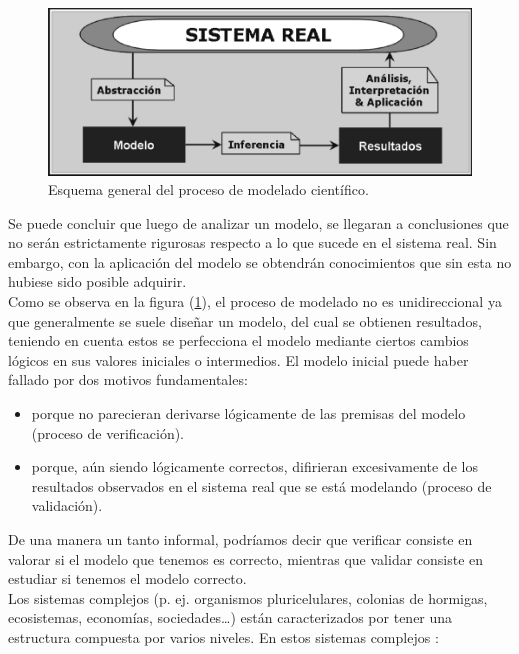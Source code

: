 \begin{figure}[!h]
	\centering
	\includegraphics[scale=0.5]{Images/esquema_modelado_cientifico.png}
	\caption{Esquema general del proceso de modelado científico. \parencite{izquierdo2008modelado}}
	\label{fig:img_1}
\end{figure}

Se puede concluir que luego de analizar un modelo, se llegaran a conclusiones que no serán estrictamente rigurosas respecto a lo que sucede en el sistema real. Sin embargo, con la aplicación del modelo se obtendrán conocimientos que sin esta no hubiese sido posible adquirir.\\

Como se observa en la figura (\ref{fig:img_1}), el proceso de modelado no es unidireccional ya que generalmente se suele diseñar un modelo, del cual se obtienen resultados, teniendo en cuenta estos se perfecciona el modelo mediante ciertos cambios lógicos en sus valores iniciales o intermedios. El modelo inicial puede haber fallado por dos motivos fundamentales:
\begin{itemize}
	\item porque no parecieran derivarse lógicamente de las premisas del modelo (proceso de verificación).
	\item porque, aún siendo lógicamente correctos, difirieran excesivamente de los resultados observados en el sistema real que se está modelando (proceso de validación). \parencite{izquierdo2008modelado}
\end{itemize}

De una manera un tanto informal, podríamos decir que verificar consiste en valorar si el modelo que tenemos es correcto, mientras que validar consiste en estudiar si tenemos el modelo correcto.\\


Los sistemas complejos (p. ej. organismos pluricelulares, colonias de hormigas, ecosistemas, economías, sociedades…) están caracterizados por tener una estructura compuesta por varios niveles. En estos sistemas complejos \parencite{vicsek2002complexity, gilbert2004agent}:

